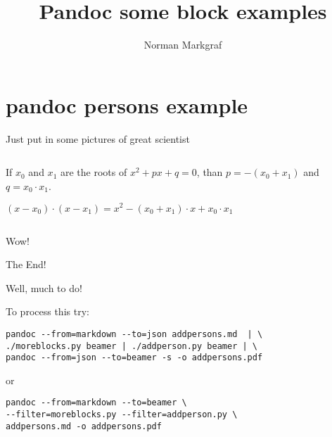 \documentclass[10pt,english,ignorenonframetext,]{beamer}
\title{Pandoc some block examples}
\author{Norman Markgraf}
\date{}
\begin{document}
\frame{\titlepage}

\section{pandoc persons example}\label{pandoc-persons-example}

\begin{frame}{Just put in some pictures of great scientist}

\begin{columns}[T,onlytextwidth]
	\begin{column}[t]{0.74\textwidth}

\begin{theorem}[of Vieta]\label{of-vieta}

If \(x_0\) and \(x_1\) are the roots of \(x^2+px+q=0\), than
\(p=-(x_0 + x_1)\) and \(q=x_0 \cdot x_1\).

\end{theorem}

\begin{Beweis}[]\label{section-1}

\((x-x_0) \cdot (x-x_1) = x^2 - (x_0+x_1) \cdot x + x_0 \cdot x_1\)

\end{Beweis}

	\end{column}
	\begin{column}{0.24\textwidth}
	\end{column}
\end{columns}

Wow!

\end{frame}

\begin{frame}[fragile]{The End!}

Well, much to do!

To process this try:

\begin{verbatim}
pandoc --from=markdown --to=json addpersons.md  | \
./moreblocks.py beamer | ./addperson.py beamer | \
pandoc --from=json --to=beamer -s -o addpersons.pdf
\end{verbatim}

or

\begin{verbatim}
pandoc --from=markdown --to=beamer \
--filter=moreblocks.py --filter=addperson.py \ 
addpersons.md -o addpersons.pdf
\end{verbatim}

\end{frame}
\end{document}
